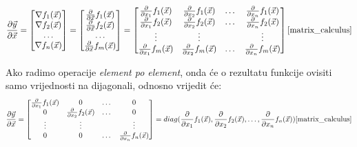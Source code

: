 \documentclass[zavrsnirad]{fer}
\begin{document}
\begin{equation}
  \frac{\partial \vec{y}}{\partial \vec{x}} =
  \begin{bmatrix}
    \nabla f_1(\vec{x}) \\
    \nabla f_2(\vec{x}) \\
    \dots \\
    \nabla f_n(\vec{x}) \\
  \end{bmatrix}
  =
  \begin{bmatrix}
    \frac{\partial}{\partial \vec{x}} f_1(\vec{x}) \\
    \frac{\partial}{\partial \vec{x}} f_2(\vec{x}) \\
    \dots \\
    \frac{\partial}{\partial \vec{x}} f_m(\vec{x}) \\
  \end{bmatrix}
  =
  \begin{bmatrix}
    \frac{\partial}{\partial x_1} f_1(\vec{x}) & \frac{\partial}{\partial x_2} f_1(\vec{x}) & \dots & \frac{\partial}{\partial x_n} f_1(\vec{x}) \\
    \frac{\partial}{\partial x_1} f_2(\vec{x}) & \frac{\partial}{\partial x_2} f_2(\vec{x}) & \dots & \frac{\partial}{\partial x_n} f_2(\vec{x}) \\
    \vdots & \vdots & & \vdots \\
    \frac{\partial}{\partial x_1} f_m(\vec{x}) & \frac{\partial}{\partial x_2} f_m(\vec{x}) & \dots & \frac{\partial}{\partial x_n} f_m(\vec{x}) \\
  \end{bmatrix}
\cite{matrix_calculus}
\end{equation}

Ako radimo operacije \textit{element po element}, onda će o rezultatu funkcije ovisiti samo vrijednosti na dijagonali, odnosno vrijedit će:
\begin{equation}
  \frac{\partial \vec{y}}{\partial \vec{x}} =
  \begin{bmatrix}
    \frac{\partial}{\partial x_1} f_1(\vec{x}) & 0 & \dots & 0 \\
    0 & \frac{\partial}{\partial x_2} f_2(\vec{x}) & \dots & 0 \\
    \vdots & \vdots & & \vdots \\
    0 & 0 & \dots & \frac{\partial}{\partial x_n} f_n(\vec{x}) \\
  \end{bmatrix}
  = diag(\frac{\partial}{\partial x_1} f_1(\vec{x}), \frac{\partial}{\partial x_2} f_2(\vec{x}), \dots, \frac{\partial}{\partial x_n} f_n(\vec{x}))
\cite{matrix_calculus}
\end{equation}
\end{document}
